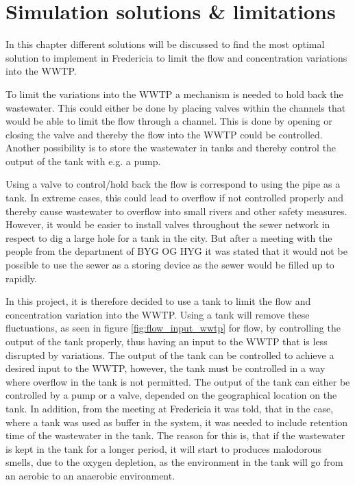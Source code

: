 
\chapter{Simulation solutions \& limitations }\label{ch:simulation_solution_and_limitation}
In this chapter different solutions will be discussed to find the most optimal solution to implement in Fredericia to limit the flow and concentration variations into the WWTP.

To limit the variations into the WWTP a mechanism is needed to hold back the wastewater. This could either be done by placing valves within the channels that would be able to limit the flow through a channel. This is done by opening or closing the valve and thereby the flow into the WWTP could be controlled. Another possibility is to store the wastewater in tanks and thereby control the output of the tank with e.g. a pump. 

Using a valve to control/hold back the flow is correspond to using the pipe as a tank. In extreme cases, this could lead to overflow if not controlled properly and thereby cause wastewater to overflow into small rivers and other safety measures. However, it would be easier to install valves throughout the sewer network in respect to dig a large hole for a tank in the city. But after a meeting with the people from the department of BYG OG HYG  it was stated that it would not be possible to use the sewer as a storing device as the sewer would be filled up to rapidly.     

In this project, it is therefore decided to use a tank to limit the flow and concentration variation into the WWTP. Using a tank will remove these fluctuations, as seen in figure \ref{fig:flow_input_wwtp} for flow, by controlling the output of the tank properly, thus having an input to the WWTP that is less disrupted by variations. The output of the tank can be controlled to achieve a desired input to the WWTP, however, the tank must be controlled in a way where overflow in the tank is not permitted. The output of the tank can either be controlled by a pump or a valve, depended on the geographical location on the tank. In addition, from the meeting at Fredericia it was told, that in the case, where a tank was used as buffer in the system, it was needed to include retention time of the wastewater in the tank. The reason for this is, that if the wastewater is kept in the tank for a longer period, it will start to produces malodorous smells, due to the oxygen depletion, as the environment in the tank will go from an aerobic to an anaerobic environment. 

